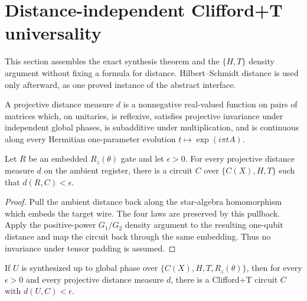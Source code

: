 \section{Distance-independent Clifford+T universality}
\label{sec:universal}

This section assembles the exact synthesis theorem and the $\{H,T\}$ density
argument without fixing a formula for distance.  Hilbert--Schmidt distance is
used only afterward, as one proved instance of the abstract interface.

\begin{definition}
  \label{def:projective_distance}
  \leanok
  A projective distance measure $d$ is a nonnegative real-valued function on
  pairs of matrices which, on unitaries, is reflexive, satisfies projective
  invariance under independent global phases, is subadditive under
  multiplication, and is continuous along every Hermitian one-parameter evolution
  $t\mapsto\exp(i\pi tA)$.
\end{definition}

\begin{lemma}
  \label{lem:rz_embedded_approx_projective}
  \leanok
  Let $R$ be an embedded $R_z(\theta)$ gate and let $\epsilon>0$.  For every
  projective distance measure $d$ on the ambient register, there is a circuit
  $C$ over $\{C(X),H,T\}$ such that $d(R,C)<\epsilon$.
\end{lemma}

\begin{proof}
  \leanok
  Pull the ambient distance back along the star-algebra homomorphism which
  embeds the target wire.  The four laws are preserved by this pullback.
  Apply the positive-power $G_1/G_2$ density argument to the resulting
  one-qubit distance and map the circuit back through the same embedding.
  Thus no invariance under tensor padding is assumed.
\end{proof}

\begin{lemma}
  \label{lem:rz_replacement_projective}
  \leanok
  If $U$ is synthesized up to global phase over
  $\{C(X),H,T,R_z(\theta)\}$, then for every $\epsilon>0$ and every projective
  distance measure $d$, there is a Clifford+T circuit $C$ with
  $d(U,C)<\epsilon$.
\end{lemma}


